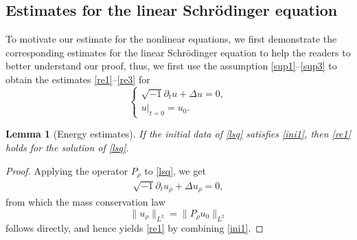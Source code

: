 \documentclass[11pt,letterpaper,reqno]{amsart}
\numberwithin{equation}{section}
\newtheorem{lemma}[theorem]{Lemma}
\theoremstyle{definition}
\theoremstyle{remark}
\newcommand{\pa}{\partial}
\begin{document}
\subsection{Estimates for the linear Schr\"odinger equation}  \label{sec2.2}
To motivate our estimate for the nonlinear equations, we first demonstrate the corresponding estimates for the linear Schr\"odinger equation to help the readers to better understand our proof, thus, we first use the assumption \eqref{sup1}--\eqref{sup3} to obtain the estimates \eqref{re1}--\eqref{re3}  for 
\begin{equation}	 \label{lsq}
	\begin{cases}
		\sqrt{-1} \pa_t u+ \Delta u=0,\\
		u|_{t=0}=u_0.
	\end{cases}
\end{equation}


\begin{lemma}[Energy estimates]
	If the initial data of \eqref{lsq} satisfies \eqref{ini1}, then \eqref{re1} holds for the solution of \eqref{lsq}.
\end{lemma}
\begin{proof}
	Applying the operator 
	 $ P_{\rho} $ to \eqref{lsq}, we get
	\begin{align} \label{linPrho}
			\sqrt{-1} \pa_t u_\rho+ \Delta   u_\rho=0,
	\end{align}
from which the mass conservation law 
	\[\|  u_\rho\|_{L^2}=	\|P_\rho u_0\|_{L^2} \]
	follows directly, and hence yields \eqref{re1} by combining \eqref{ini1}.
\end{proof}
\end{document}
